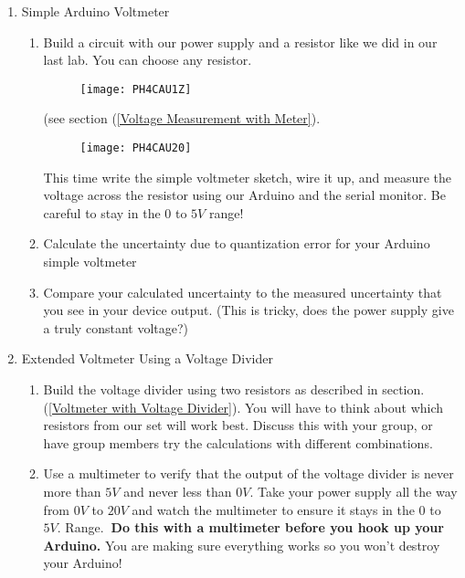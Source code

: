 \begin{enumerate}
\item Simple Arduino Voltmeter

\begin{enumerate}
\item Build a circuit with our power supply and a resistor like we did in
our last lab. You can choose any resistor. \begin{figure}[h!]
\texttt{[image: PH4CAU1Z]}
\end{figure}(see section (\ref{Voltage
Measurement with Meter}). \begin{figure}[h!]
\texttt{[image: PH4CAU20]}
\end{figure}This time write the simple
voltmeter sketch, wire it up, and measure the voltage across the resistor
using our Arduino and the serial monitor. Be careful to stay in the $0$ to $5%
\unit{V}$ range!

\item Calculate the uncertainty due to quantization error for your Arduino
simple voltmeter

\item Compare your calculated uncertainty to the measured uncertainty that
you see in your device output. (This is tricky, does the power supply give a
truly constant voltage?)
\end{enumerate}

\item Extended Voltmeter Using a Voltage Divider

\begin{enumerate}
\item Build the voltage divider using two resistors as described in section.
(\ref{Voltmeter with Voltage Divider}). You will have to think about which
resistors from our set will work best. Discuss this with your group, or have
group members try the calculations with different combinations.

\item Use a multimeter to verify that the output of the voltage divider is
never more than $5\unit{V}$ and never less than $0\unit{V}.$ Take your power
supply all the way from $0\unit{V}$ to $20\unit{V}$ and watch the multimeter
to ensure it stays in the $0$ to $5\unit{V}.$ Range.\textbf{\ Do this with a
multimeter before you hook up your Arduino.} You are making sure everything
works so you won't destroy your Arduino!


\end{enumerate}
\end{enumerate}
